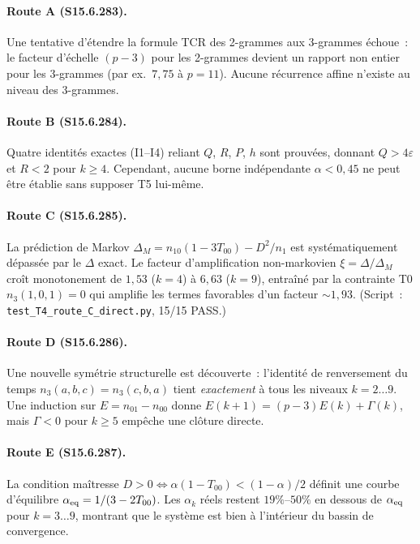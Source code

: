\documentclass[12pt,a4paper]{article}
\begin{document}
\paragraph{Route A (S15.6.283).}
Une tentative d'étendre la formule TCR des 2-grammes aux 3-grammes
échoue~: le facteur d'échelle $(p-3)$ pour les 2-grammes devient un
rapport non entier pour les 3-grammes (par ex.\ $7{,}75$ à
$p = 11$). Aucune récurrence affine n'existe au niveau des 3-grammes.

\paragraph{Route B (S15.6.284).}
Quatre identités exactes (I1--I4) reliant $Q$, $R$, $P$, $h$ sont
prouvées, donnant $Q > 4\varepsilon$ et $R < 2$ pour $k \geq 4$.
Cependant, aucune borne indépendante $\alpha < 0{,}45$ ne peut être
établie sans supposer T5 lui-même.

\paragraph{Route C (S15.6.285).}
La prédiction de Markov
$\Delta_M = n_{10}(1 - 3T_{00}) - D^2/n_1$
est systématiquement dépassée par le $\Delta$ exact. Le facteur
d'amplification non-markovien $\xi = \Delta/\Delta_M$ croît
monotonement de $1{,}53$ ($k = 4$) à $6{,}63$ ($k = 9$), entraîné par
la contrainte T0 $n_3(1,0,1) = 0$ qui amplifie les termes favorables
d'un facteur $\sim 1{,}93$.
(Script~: \texttt{test\_T4\_route\_C\_direct.py}, 15/15 PASS.)

\paragraph{Route D (S15.6.286).}
Une nouvelle symétrie structurelle est découverte~: l'identité de
renversement du temps $n_3(a,b,c) = n_3(c,b,a)$ tient
\emph{exactement} à tous les niveaux $k = 2\ldots 9$. Une induction
sur $E = n_{01} - n_{00}$ donne
$E(k+1) = (p-3)E(k) + \Gamma(k)$,
mais $\Gamma < 0$ pour $k \geq 5$ empêche une clôture directe.

\paragraph{Route E (S15.6.287).}
La condition maîtresse
$D > 0 \Leftrightarrow \alpha(1-T_{00}) < (1-\alpha)/2$
définit une courbe d'équilibre $\alpha_{\rm eq} = 1/(3-2T_{00})$. Les
$\alpha_k$ réels restent $19\%$--$50\%$ en dessous de
$\alpha_{\rm eq}$ pour $k = 3\ldots 9$, montrant que le système est
bien à l'intérieur du bassin de convergence.
\end{document}
